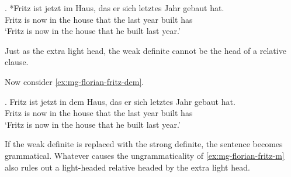 \exg. *Fritz ist jetzt im Haus, das er sich letztes Jahr gebaut hat.\\
Fritz is now {in the} house that the  last year built has\\
`Fritz is now in the house that he built last year.' \label{ex:mg-florian-fritz-m}

Just as the extra light head, the weak definite cannot be the head of a relative clause.

Now consider \ref{ex:mg-florian-fritz-dem}.

\exg. Fritz ist jetzt in dem Haus, das er sich letztes Jahr gebaut hat.\\
Fritz is now in the house that the  last year built has\\
`Fritz is now in the house that he built last year.' \label{ex:mg-florian-fritz-dem}

If the weak definite is replaced with the strong definite, the sentence becomes grammatical.
Whatever causes the ungrammaticality of \ref{ex:mg-florian-fritz-m} also rules out a light-headed relative headed by the extra light head.
